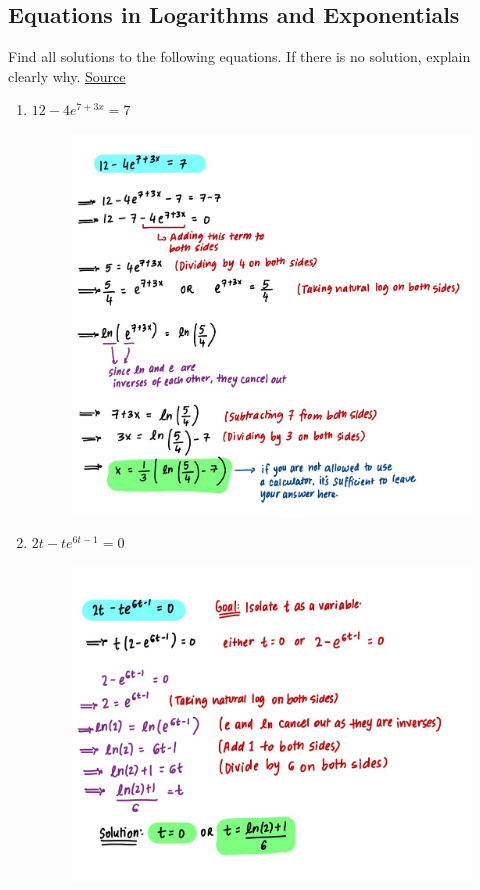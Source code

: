 \documentclass{article}
\begin{document}
\subsection*{Equations in Logarithms and Exponentials}
Find all solutions to the following equations. If there is no solution, explain clearly why.
\newline \noindent \href{https://tutorial.math.lamar.edu/problems/calci/explogeqns.aspx}{Source}
\begin{enumerate}
    \item $12 - 4e^{7+3x} = 7$
    \begin{figure}[H]
        \centering
        \includegraphics[width=\linewidth]{Q1.jpg}
        \label{fig:Q1}
    \end{figure}
    \newpage
    \item $2t - te^{6t-1} = 0$
    \begin{figure}[H]
        \centering
        \includegraphics[width=0.75\linewidth]{Q2.jpg}

\end{figure}
\end{enumerate}
\end{document}
